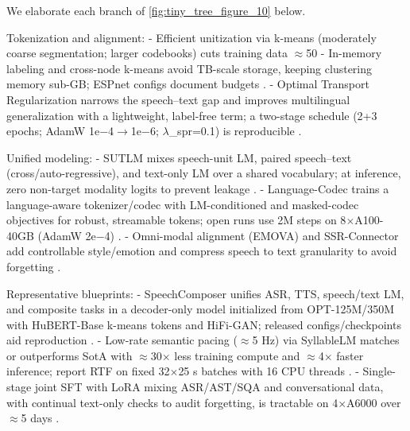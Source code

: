 \documentclass{article}
\begin{document}
We elaborate each branch of \autoref{fig:tiny_tree_figure_10} below.

Tokenization and alignment:
- Efficient unitization via k-means (moderately coarse segmentation; larger codebooks) cuts training data $\approx$50%
- In-memory labeling and cross-node k-means avoid TB-scale storage, keeping clustering memory sub-GB; ESPnet configs document budgets \cite{chen2023reducingbarriersselfsupervisedlearninghu}.
- Optimal Transport Regularization narrows the speech--text gap and improves multilingual generalization with a lightweight, label-free term; a two-stage schedule (2+3 epochs; AdamW 1e$-$4$\rightarrow$1e$-$6; $\lambda$_spr=0.1) is reproducible \cite{xu2025optimaltransportregularizationspeechtext}.

Unified modeling:
- SUTLM mixes speech-unit LM, paired speech--text (cross/auto-regressive), and text-only LM over a shared vocabulary; at inference, zero non-target modality logits to prevent leakage \cite{entry2025towardjointlanguagemodelingspeechunitste,cuervo2025textspeechlanguagemodelsimprovedcrossmod,wang2024c3llmconditionalmultimodalcontentgenerat}.
- Language-Codec trains a language-aware tokenizer/codec with LM-conditioned and masked-codec objectives for robust, streamable tokens; open runs use 2M steps on 8$\times$A100-40GB (AdamW 2e$-$4) \cite{ji2025languagecodecbridgingdiscreterepresentat,kim2024enclapcombiningneuralaudiocodectextjoint,huang2024repcodecspeechrepresentationcodectokeniz}.
- Omni-modal alignment (EMOVA) and SSR-Connector add controllable style/emotion and compress speech to text granularity to avoid forgetting \cite{chen2025emovaempoweringlanguagemodelsseehearspea,tan2025ssralignmentawaremodalityconnectorspeech}.

Representative blueprints:
- SpeechComposer unifies ASR, TTS, speech/text LM, and composite tasks in a decoder-only model initialized from OPT-125M/350M with HuBERT-Base k-means tokens and HiFi-GAN; released configs/checkpoints aid reproduction \cite{wu2024speechcomposerunifyingmultiplespeechtask}.
- Low-rate semantic pacing ($\approx$5 Hz) via SyllableLM matches or outperforms SotA with $\approx$30$\times$ less training compute and $\approx$4$\times$ faster inference; report RTF on fixed 32$\times$25 s batches with 16 CPU threads \cite{baade2024syllablelmlearningcoarsesemanticunitsspe}.
- Single-stage joint SFT with LoRA mixing ASR/AST/SQA and conversational data, with continual text-only checks to audit forgetting, is tractable on 4$\times$A6000 over $\approx$5 days \cite{har-tuv2025pastphoneticacousticspeechtokenizer,hsiao2025analyzingmitigationstrategiescatastrophi}.
\end{document}

